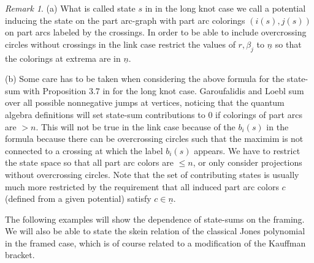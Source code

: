 \documentclass[11pt]{article}
\theoremstyle{definition}
\theoremstyle{remark}
\newtheorem*{rem}{Remark}
\theoremstyle{remark}
\begin{document}
\begin{rem} (a) What is called state $s$ in \cite{G} in the long knot case we call a potential inducing the state on the part arc-graph with part arc colorings $(i(s),j(s))$ on part arcs labeled by the crossings. In order to be able to include overcrossing circles without crossings in the link case restrict the values of $r,\beta_j$ to $\underline{n}$ so that the colorings at extrema are in $\underline{n}$.

\noindent (b) Some care has to be taken when considering the above formula for the state-sum with Proposition 3.7 in \cite{GL} for the long knot case. Garoufalidis and Loebl sum over all possible nonnegative jumps at vertices, noticing that the quantum algebra definitions will set state-sum contributions to $0$ if colorings of part arcs are $>n$. This will not be true in the link case because of the $b_i(s)$ in the formula because there can be overcrossing circles such that the maximim is not connected to a crossing at which the label $b_i(s)$ appears. We have to restrict the state space so that all part arc colors are $\leq n$, or only consider projections without overcrossing circles. Note that the set of contributing states is usually much more restricted by the requirement that all induced part arc colors $c$ (defined from a given potential) satisfy $c\in \underline{n}$. 
\end{rem}


\noindent The following examples will show the dependence of state-sums on the framing.
We will also be able to state the skein relation of the classical Jones polynomial in the framed case, which is of course related to a modification of the Kauffman bracket. 
\end{document}
